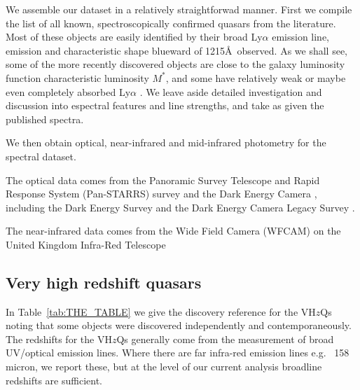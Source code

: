 \documentclass[usenatbib]{mnras}
\begin{document}
We assemble our dataset in a relatively straightforwad manner.  First
we compile the list of all known, spectroscopically confirmed quasars
from the literature. Most of these objects are easily identified by
their broad Ly$\alpha$ emission line, \nv emission and characteristic
shape blueward of 1215\AA\ observed. As we shall see, some of the more
recently discovered objects are close to the galaxy luminosity
function characteristic luminosity $M^{*}$, and some have relatively
weak or maybe even completely absorbed Ly$\alpha$ \citep[e.g. Figures
7 and 10 in][]{Banados2016}. We leave aside detailed investigation and
discussion into espectral features and line strengths, and take as given 
the published spectra. 

We then obtain optical, near-infrared and mid-infrared photometry for the
spectral dataset. 

The optical data comes from the 
Panoramic Survey Telescope and Rapid Response System (Pan-STARRS) 
survey \citep{Chambers2016} and the Dark Energy Camera \citep{Flaugher2015}, 
including the Dark Energy Survey \citep[DES;][]{Flaugher2005} and 
the Dark Energy Camera Legacy Survey \citep[DECaLS]{Dey2018}. 

The near-infrared data comes from the Wide Field Camera (WFCAM) on 
the United Kingdom Infra-Red Telescope






\subsection{Very high redshift quasars}
In Table~\ref{tab:THE_TABLE} we give the discovery reference for the
VH$z$Qs noting that some objects were discovered independently and
contemporaneously.  The redshifts for the VH$z$Qs generally come from
the measurement of broad UV/optical emission lines. Where 
there are far infra-red emission lines e.g. \cii~158 micron, we report 
these, but at the level of our current analysis broadline redshifts are
sufficient. 
\end{document}
